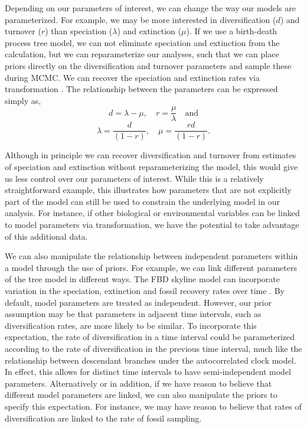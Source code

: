 \documentclass[11pt]{article}
\newcommand{\edit}[1]{{\textcolor{red}{#1}}} %
\begin{document}
Depending on our parameters of interest, we can change the way our models are parameterized.
For example, we may be more interested in diversification ($d$) and turnover ($r$) than speciation ($\lambda$) and extinction ($\mu$).
If we use a birth-death process tree model, we can not eliminate speciation and extinction from the calculation, but we can reparameterize our analyses, such that we can place priors directly on the diversification and turnover parameters and sample these during MCMC. We can recover the speciation and extinction rates via transformation \citep{Heath2014}.
The relationship between the parameters can be expressed simply as, 
$$d = \lambda - \mu, \quad r = \frac{\mu}{\lambda} \quad \textrm{and} $$ 
$$\lambda = \frac{d}{(1-r)}, \quad \mu = \frac{rd}{(1 - r)}.$$

Although in principle we can recover diversification and turnover from estimates of speciation and extinction without reparameterizing the model, this would give us less control over our parameters of interest. 
While this is a relatively straightforward example, this illustrates how parameters that are not explicitly part of the model can still be used to constrain the underlying model in our analysis. 
For instance, if other biological or environmental variables %
can be linked to model parameters via transformation, we have the potential to take advantage of this additional data.




We can also manipulate the relationship between independent %
parameters within a model through the use of priors.
For example, we can link different parameters of the tree model in different ways.
The FBD skyline model can incorporate variation in the speciation, extinction and fossil recovery rates over time \cite{Gavryushkina2014,Zhang2016}.
By default, model parameters are treated as independent.
However, our prior assumption may be that parameters in adjacent time intervals, such as diversification rates, are more likely to be similar.
To incorporate this expectation, the rate of diversification in a time interval could be parameterized according to the rate of diversification in the previous time interval, much like the relationship between descendant branches under the autocorrelated clock model. %
In effect, this allows for distinct time intervals to have semi-independent model parameters.
Alternatively or in addition, if we have reason to believe that different model parameters are linked, we can also manipulate the priors to specify this expectation.
For instance, we may have reason to believe that rates of diversification are linked to the rate of fossil sampling.
\end{document}
